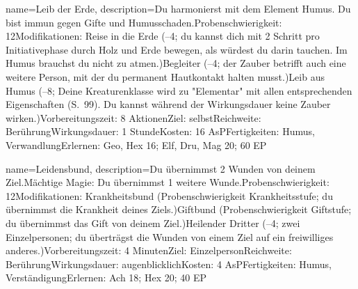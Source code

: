 {
    name={Leib der Erde},
    description={Du harmonierst mit dem Element Humus. Du bist immun gegen Gifte und Humusschaden.\newline Probenschwierigkeit: 12\newline Modifikationen: Reise in die Erde (–4; du kannst dich mit 2 Schritt pro Initiativephase durch Holz und Erde bewegen, als würdest du darin tauchen. Im Humus brauchst du nicht zu atmen.)\newline Begleiter (–4; der Zauber betrifft auch eine weitere Person, mit der du permanent Hautkontakt halten musst.)\newline Leib aus Humus (–8; Deine Kreaturenklasse wird zu "Elementar" mit allen entsprechenden Eigenschaften (S. 99). Du kannst während der Wirkungsdauer keine Zauber wirken.)\newline Vorbereitungszeit: 8 Aktionen\newline Ziel: selbst\newline Reichweite: Berührung\newline Wirkungsdauer: 1 Stunde\newline Kosten: 16 AsP\newline Fertigkeiten: Humus, Verwandlung\newline Erlernen: Geo, Hex 16; Elf, Dru, Mag 20; 60 EP}
}


{
    name={Leidensbund},
    description={Du übernimmst 2 Wunden von deinem Ziel.\newline Mächtige Magie: Du übernimmst 1 weitere Wunde.\newline Probenschwierigkeit: 12\newline Modifikationen: Krankheitsbund (Probenschwierigkeit Krankheitsstufe; du übernimmst die Krankheit deines Ziels.)\newline Giftbund (Probenschwierigkeit Giftstufe; du übernimmst das Gift von deinem Ziel.)\newline Heilender Dritter (–4; zwei Einzelpersonen; du überträgst die Wunden von einem Ziel auf ein freiwilliges anderes.)\newline Vorbereitungszeit: 4 Minuten\newline Ziel: Einzelperson\newline Reichweite: Berührung\newline Wirkungsdauer: augenblicklich\newline Kosten: 4 AsP\newline Fertigkeiten: Humus, Verständigung\newline Erlernen: Ach 18; Hex 20; 40 EP}
}



